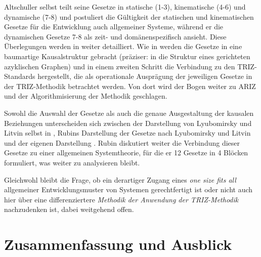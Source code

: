 \documentclass[12pt,a4paper]{article}
\begin{document}
Altschuller selbst teilt seine Gesetze in statische (1-3), kinematische (4-6)
und dynamische (7-8) und postuliert die Gültigkeit der statischen und
kinematischen Gesetze für die Entwicklung auch allgemeiner Systeme, während er
die dynamischen Gesetze 7-8 als zeit- und domänenspezifisch ansieht.  Diese
Überlegungen werden in \cite{Rubin2019} weiter detailliert. Wie in
\cite{TESE2018} werden die Gesetze in eine baumartige Kausalstruktur gebracht
(präziser: in die Struktur eines gerichteten azyklischen Graphen) und in einem
zweiten Schritt die Verbindung zu den TRIZ-Standards hergestellt, die als
operationale Ausprägung der jeweiligen Gesetze in der TRIZ-Methodik betrachtet
werden. Von dort wird der Bogen weiter zu ARIZ und der Algorithmisierung der
Methodik geschlagen.

Sowohl die Auswahl der Gesetze als auch die genaue Ausgestaltung der kausalen
Beziehungen unterscheiden sich zwischen der Darstellung von Lyubomirsky und
Litvin selbst in \cite[S. 6]{TESE2018}, Rubins Darstellung der Gesetze nach
Lyubomirsky und Litvin \cite[Abb. 1]{Rubin2019} und der eigenen Darstellung
\cite[Abb. 2]{Rubin2019}. Rubin diskutiert weiter die Verbindung dieser
Gesetze zu einer allgemeinen Systemtheorie, für die er 12 Gesetze in 4 Blöcken
formuliert, was weiter zu analysieren bleibt.

Gleichwohl bleibt die Frage, ob ein derartiger Zugang eines \emph{one size
  fits all} allgemeiner Entwicklungsmuster von Systemen gerechtfertigt ist
oder nicht auch hier über eine differenziertere \emph{Methodik der Anwendung
  der TRIZ-Methodik} nachzudenken ist, dabei weitgehend offen. 

\section{Zusammenfassung und Ausblick}
\end{document}
